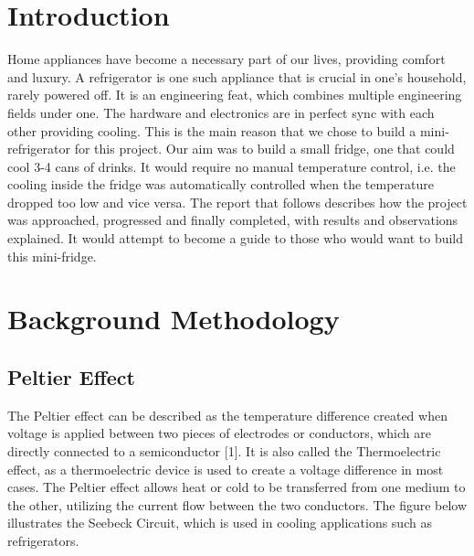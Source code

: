 \documentclass[12pt,onecolumn]{article}
\begin{document}

\newpage
\tableofcontents

\newpage
\section{Introduction}
Home appliances have become a necessary part of our lives, providing comfort and luxury. A refrigerator is one such appliance that is crucial in one's household, rarely powered off. It is an engineering feat, which combines multiple engineering fields under one. The hardware and electronics are in perfect sync with each other providing cooling. This is the main reason that we chose to build a mini-refrigerator for this project. Our aim was to build a small fridge, one that could cool 3-4 cans of drinks. It would require no manual temperature control, i.e. the cooling inside the fridge was automatically controlled when the temperature dropped too low and vice versa. The report that follows describes how the project was approached, progressed and finally completed, with results and observations explained. It would attempt to become a guide to those who would want to build this mini-fridge. 

\section{Background Methodology}
\subsection{Peltier Effect}
The Peltier effect can be described as the temperature difference created when voltage is applied between two pieces of electrodes or conductors, which are directly connected to a semiconductor [1]. It is also called the Thermoelectric effect, as a thermoelectric device is used to create a voltage difference in most cases. The Peltier effect allows heat or cold to be transferred from one medium to the other, utilizing the current flow between the two conductors. The figure below illustrates the Seebeck Circuit, which is used in cooling applications such as refrigerators. 
\end{document}
